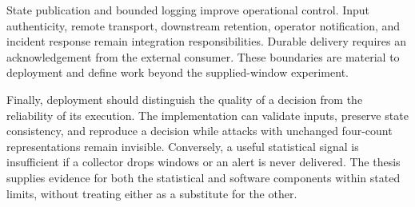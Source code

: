State publication and bounded logging improve operational control.
Input authenticity, remote transport, downstream retention,
operator notification, and incident response remain integration
responsibilities. Durable delivery requires an acknowledgement from the
external consumer. These boundaries are material to deployment and define
work beyond the supplied-window experiment.

Finally, deployment should distinguish the quality of a decision
from the reliability of its execution. The implementation can
validate inputs, preserve state consistency, and reproduce a
decision while attacks with unchanged four-count representations remain
invisible. Conversely, a useful statistical signal is insufficient
if a collector drops windows or an alert is never delivered. The
thesis supplies evidence for both the statistical and software
components within stated limits, without treating either as a
substitute for the other.

